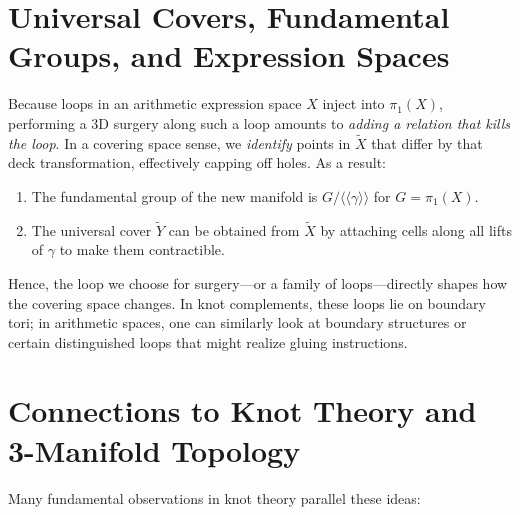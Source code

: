 \documentclass[11pt]{article}
\theoremstyle{remark}
\begin{document}
    \bigskip

    \section{Universal Covers, Fundamental Groups, and Expression Spaces}
    \label{sec:cover-and-fg}

    Because loops in an arithmetic expression space $X$ inject into $\pi_1(X)$, performing a 3D surgery along such a loop amounts to \emph{adding a relation that kills the loop}. In a covering space sense, we \emph{identify} points in $\widetilde{X}$ that differ by that deck transformation, effectively capping off holes. As a result:

    \begin{enumerate}[label=(\alph*)]
        \item The fundamental group of the new manifold is $G/\langle\!\langle \gamma\rangle\!\rangle$ for $G=\pi_1(X)$.
        \item The universal cover $\widetilde{Y}$ can be obtained from $\widetilde{X}$ by attaching cells along all lifts of $\gamma$ to make them contractible.
    \end{enumerate}

    Hence, the loop we choose for surgery---or a family of loops---directly shapes how the covering space changes. In knot complements, these loops lie on boundary tori; in arithmetic spaces, one can similarly look at boundary structures or certain distinguished loops that might realize gluing instructions.

    \bigskip

    \section{Connections to Knot Theory and 3-Manifold Topology}
    \label{sec:knot-theory}

    Many fundamental observations in knot theory parallel these ideas:
\end{document}
